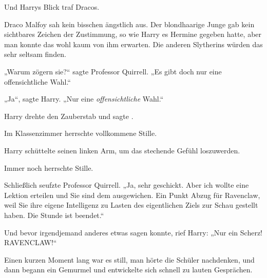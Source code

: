Und Harrys Blick traf Dracos.

Draco Malfoy sah kein bisschen ängstlich aus. Der blondhaarige Junge gab kein sichtbares Zeichen der Zustimmung, so wie Harry es Hermine gegeben hatte, aber man konnte das wohl kaum von ihm erwarten. Die anderen Slytherins würden das sehr seltsam finden.

„Warum zögern sie?“ sagte Professor Quirrell.
„Es gibt doch nur eine offensichtliche Wahl.“

„Ja“, sagte Harry.
„Nur eine \emph{offensichtliche} Wahl.“

Harry drehte den Zauberstab und sagte .

Im Klassenzimmer herrschte vollkommene Stille.

Harry schüttelte seinen linken Arm, um das stechende Gefühl loszuwerden.

Immer noch herrschte Stille.

Schließlich seufzte Professor Quirrell.
„Ja, sehr geschickt. Aber ich wollte eine Lektion erteilen und Sie sind dem ausgewichen. Ein Punkt Abzug für Ravenclaw, weil Sie ihre eigene Intelligenz zu Lasten des eigentlichen Ziels zur Schau gestellt haben. Die Stunde ist beendet.“


Und bevor irgendjemand anderes etwas sagen konnte, rief Harry:
„Nur ein Scherz! RAVENCLAW!“

Einen kurzen Moment lang war es still, man hörte die Schüler nachdenken, und dann begann ein Gemurmel und entwickelte sich schnell zu lauten Gesprächen.

